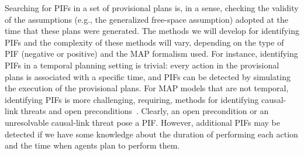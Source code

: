 \documentclass[11pt]{article}
\newcommand{\vac}[2]{\textit{Vacuumed(#1,#2)}}
\newcommand{\move}[3]{\textit{Move$_{#1}$(#2,#3)}}
\begin{document}




Searching for PIFs in a set of provisional plans is, in a sense, checking the validity of the assumptions (e.g., the generalized free-space assumption) adopted at the time that these plans were generated. 
The methods we will develop for identifying PIFs and the complexity of these methods will vary, depending on the type of PIF (negative or positive) and the MAP formalism used. For instance, identifying PIFs in a temporal planning setting is trivial: every action in the provisional plans is associated with a specific time, and PIFs can be detected by simulating the execution of the provisional plans.  For MAP models that are not temporal, identifying PIFs is more challenging, requiring, methods for identifying causal-link threats and open preconditions~\cite{cox2009efficient}. Clearly, an open precondition or an unresolvable causal-link threat pose a PIF. However, additional PIFs may be detected if we have some knowledge about the duration of performing each action and the time when agents plan to perform them. 
\end{document}
